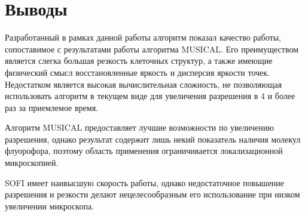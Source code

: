 \section{Выводы}

Разработанный в рамках данной работы алгоритм показал качество работы, сопоставимое с результатами работы алгоритма MUSICAL. Его преимуществом является слегка большая резкость клеточных структур, а также имеющие физический смысл восстановленные яркость и дисперсия яркости точек. Недостатком является высокая вычислительная сложность, не позволяющая использовать алгоритм в текущем виде для увеличения разрешения в 4 и более раз за приемлемое время.

Алгоритм MUSICAL предоставляет лучшие возможности по увеличению разрешения, однако результат содержит лишь некий показатель наличия молекул флуорофора, поэтому область применения ограничивается локализационной микроскопией.

SOFI имеет наивысшую скорость работы, однако недостаточное повышение разрешения и резкости делают нецелесообразным его использование при низком увеличении микроскопа.




\FloatBarrier
